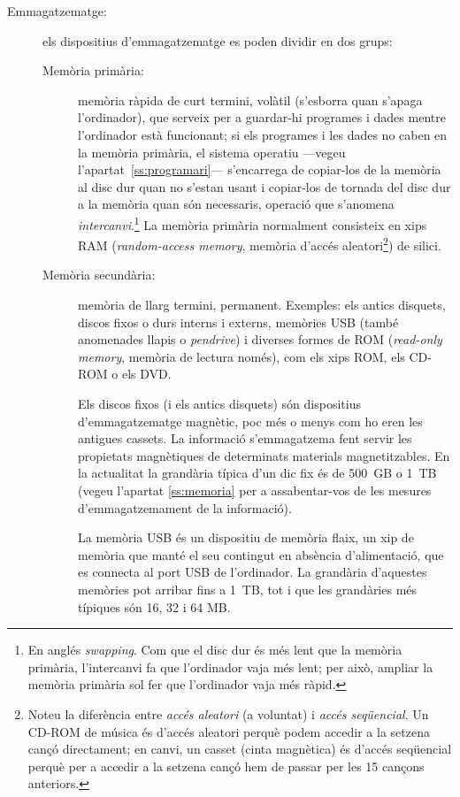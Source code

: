 \begin{description}
\item[Emmagatzematge:] els dispositius d'emmagatzematge es poden
  dividir en dos grups:
  \begin{description}
  \item[Memòria primària:] memòria ràpida de curt termini, volàtil
    (s'esborra quan s'apaga l'ordinador), que serveix per a guardar-hi
    programes i dades mentre l'ordinador està funcionant; si els
    programes i les dades no caben en la memòria primària, el sistema
    operatiu ---vegeu l'apartat~\ref{ss:programari}--- s'encarrega de
    copiar-los de la memòria al disc dur quan no s'estan usant i
    copiar-los de tornada del disc dur a la memòria quan són
    necessaris, operació que s'anomena \emph{intercanvi}.\footnote{En
      anglés \emph{swapping}. Com que el disc dur és més lent que la
      memòria primària, l'intercanvi fa que l'ordinador vaja més lent;
      per això, ampliar la memòria primària sol fer que l'ordinador
      vaja més ràpid.} La memòria primària normalment consisteix en
    xips RAM (\emph{random-access memory}, memòria d'accés
    aleatori\footnote{Noteu la diferència entre \emph{accés aleatori}
      (a voluntat) i \emph{accés seqüencial}. Un CD-ROM de música és
      d'accés aleatori perquè podem accedir a la setzena cançó
      directament; en canvi, un casset (cinta magnètica) és d'accés
      seqüencial perquè per a accedir a la setzena cançó hem de passar
      per les 15 cançons anteriors.}) de silici.
      
  \item[Memòria secundària:] memòria de llarg termini, permanent.
    Exemples: els antics disquets, discos fixos o durs interns i
    externs, memòries USB (també anomenades llapis o \emph{pendrive})
    i diverses formes de ROM (\emph{read-only memory}, memòria de
    lectura només), com els xips ROM, els CD-ROM o els DVD.  

    Els discos fixos (i els antics disquets) són dispositius
    d'emmagatzematge magnètic, poc més o menys com ho eren les
    antigues cassets. La informació s'emmagatzema fent servir les
    propietats magnètiques de determinats materials magnetitzables. En
    la actualitat la grandària típica d'un dic fix és de 500~GB o 1~TB
    (vegeu l'apartat \ref{ss:memoria} per a assabentar-vos de les
    mesures d'emmagatzemament de la informació).

    La memòria USB és un dispositiu de memòria flaix, un xip de
    memòria que manté el seu contingut en absència d'alimentació, que
    es connecta al port USB de l'ordinador. La grandària d'aquestes
    memòries pot arribar fins a 1~TB, tot i que les grandàries més
    típiques són 16, 32 i 64 MB.


\end{description}
\end{description}
